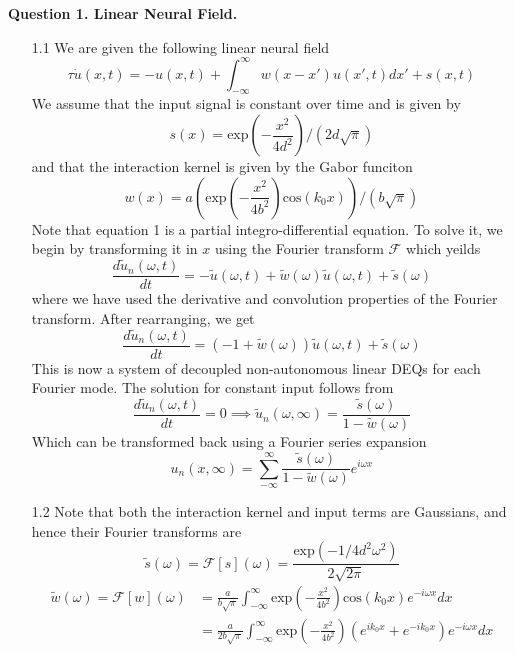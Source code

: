 \documentclass[12pt]{article}
\begin{document}
\noindent


\noindent\textbf{Question 1. Linear Neural Field.}
\begin{enumerate}
\item[1.1] We are given the following linear neural field
\begin{equation}
    \tau \dot{u}(x, t) =   -u(x, t) + \int_{-\infty}^{\infty}w(x-x')u(x', t)dx' + s(x, t)
\end{equation}
We assume that the input signal is constant over time and is given by 
\begin{equation}
    s(x) = \text{exp}\left(-\frac{x^2}{4d^2}\right)/(2d\sqrt{\pi})
\end{equation}
and that the interaction kernel is given by the Gabor funciton
\begin{equation}
    w(x) = a\left(\text{exp}\left(-\frac{x^2}{4b^2}\right)\text{cos}(k_{0}x)\right)/(b\sqrt{\pi})
\end{equation}
Note that equation 1 is a partial integro-differential equation. To solve it, we begin by transforming it in $x$ 
using the Fourier transform $\mathcal{F}$ which yeilds
\[
    \frac{d\widetilde{u}_{n}(\omega, t)}{dt} = -\widetilde{u}(\omega, t) + \widetilde{w}(\omega)\widetilde{u}(\omega, t) + \widetilde{s}(\omega)
\]
where we have used the derivative and convolution properties of the Fourier transform. After rearranging, we get
\[
    \frac{d\widetilde{u}_{n}(\omega, t)}{dt} = (-1 + \widetilde{w}(\omega))\widetilde{u}(\omega, t) + \widetilde{s}(\omega)
\]
This is now a system of decoupled non-autonomous linear DEQs for each Fourier mode. The solution for constant input follows from
\[
    \frac{d\widetilde{u}_{n}(\omega, t)}{dt} = 0 \implies \widetilde{u}_{n}(\omega, \infty) = \frac{\widetilde{s}(\omega)}{1 - \widetilde{w}(\omega)}
\]
Which can be transformed back using a Fourier series expansion
\[
    u_{n}(x, \infty) = \sum_{-\infty}^{\infty}\frac{\widetilde{s}(\omega)}{1 - \widetilde{w}(\omega)}e^{i\omega x}
\]
\item[1.2] Note that both the interaction kernel and input terms are Gaussians, and hence their Fourier transforms are 
\[
    \widetilde{s}(\omega) = \mathcal{F}[s](\omega) =  \frac{\text{exp}(-1/4d^{2}\omega^{2})}{2\sqrt{2\pi}}
\]
\begin{align*}
    \widetilde{w}(\omega) = \mathcal{F}[w](\omega) &= \frac{a}{b\sqrt{\pi}}\int_{-\infty}^{\infty}\text{exp}\left(-\frac{x^2}{4b^{2}}\right)\text{cos}(k_{0}x)e^{-i\omega x}dx\\
                           &= \frac{a}{2b\sqrt{\pi}}\int_{-\infty}^{\infty}\text{exp}\left(-\frac{x^2}{4b^{2}}\right)(e^{ik_{0}x}+e^{-ik_{0}x})e^{-i\omega x}dx\\

\end{align*}
\end{enumerate}
\end{document}
